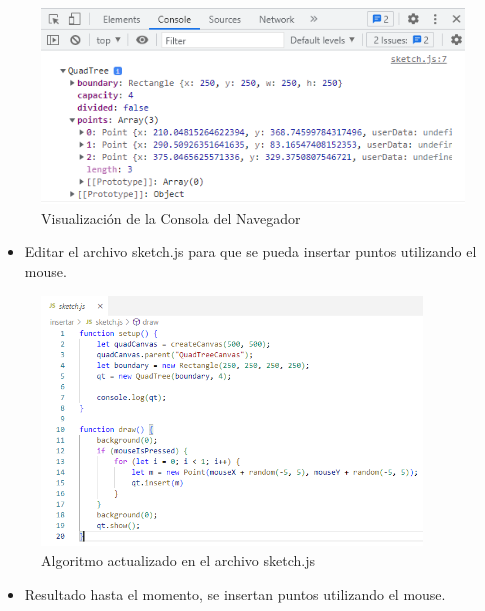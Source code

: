 \documentclass{article}
\begin{document}
\begin{enumerate}
\begin{figure}[H]
\centering
\includegraphics[width=1\textwidth]{Img/consola_web_quadtree.png}
\caption{Visualización de la Consola del Navegador}
\end{figure}

\begin{itemize}
   \item Editar el archivo sketch.js para que se pueda insertar puntos utilizando el mouse.
\end{itemize}

\begin{figure}[H]
\centering
\includegraphics[width=0.9\textwidth]{Img/sketch_insert.png}
\caption{Algoritmo actualizado en el archivo sketch.js}
\end{figure}

\begin{itemize}
   \item Resultado hasta el momento, se insertan puntos utilizando el mouse.
\end{itemize}


\end{enumerate}
\end{document}
